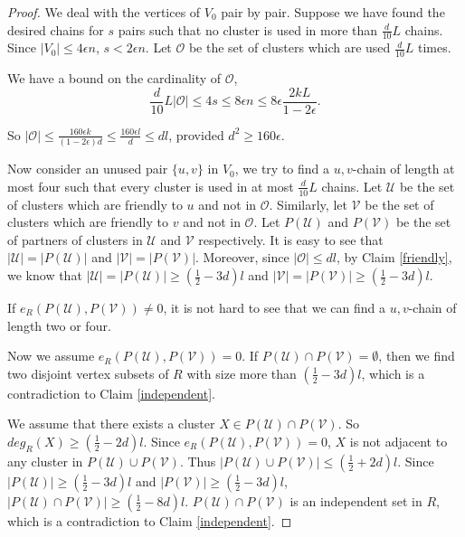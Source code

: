 \documentclass[11pt]{article}
\begin{document}
\begin{proof}
We deal with the vertices of $V_0$ pair by pair. Suppose we have found the desired chains for $s$ pairs such that no cluster is used in more than $\frac{d}{10}L$ chains. Since $|V_0|\leq 4\epsilon n$, $s<2\epsilon n$. Let $\mathcal{O}$ be the set of clusters which are used $\frac{d}{10}L$ times.

We have a bound on the cardinality of $\mathcal{O}$,
$$\frac{d}{10}L|\mathcal{O}|\leq 4s\leq 8\epsilon n\leq 8\epsilon \frac{2kL}{1-2\epsilon }.$$

So $|\mathcal{O}|\leq \frac{160\epsilon k}{(1-2\epsilon )d}\leq \frac{160\epsilon l}{d}\leq dl$, provided $d^2\geq 160\epsilon$.

Now consider an unused pair $\{u,v\}$ in $V_0$, we try to find a $u,v$-chain of length at most four such that every cluster is used in at most $\frac{d}{10}L$ chains. Let $\mathcal {U}$ be the set of clusters which are friendly to $u$ and not in $\mathcal{O}$. Similarly, let $\mathcal {V}$ be the set of clusters which are friendly to $v$ and not in $\mathcal{O}$. Let $P(\mathcal{U})$ and $P(\mathcal{V})$ be the set of partners of clusters in $\mathcal {U}$ and $\mathcal {V}$ respectively. It is easy to see that $|\mathcal {U}|=|P(\mathcal{U})|$ and $|\mathcal {V}|=|P(\mathcal{V})|$. Moreover, since $|\mathcal{O}|\leq dl$, by Claim \ref{friendly}, we know that $|\mathcal {U}|=|P(\mathcal{U})|\geq (\frac{1}{2}-3d)l$ and $|\mathcal {V}|=|P(\mathcal{V})|\geq (\frac{1}{2}-3d)l$.

If $e_R(P(\mathcal{U}),P(\mathcal{V}))\not =0$, it is not hard to see that we can find a $u,v$-chain of length two or four.

Now we assume $e_R(P(\mathcal{U}),P(\mathcal{V}))=0$. If $P(\mathcal{U})\cap P(\mathcal{V})=\emptyset $, then we find two disjoint vertex subsets of $R$ with size more than $(\frac{1}{2}-3d)l$, which is a contradiction to Claim \ref{independent}.

We assume that there exists a cluster $X\in P(\mathcal{U})\cap P(\mathcal{V})$. So $deg_R(X)\geq (\frac{1}{2}-2d)l$. Since $e_R(P(\mathcal{U}),P(\mathcal{V}))=0$, $X$ is not adjacent to any cluster in $P(\mathcal{U})\cup P(\mathcal{V})$. Thus $|P(\mathcal{U})\cup P(\mathcal{V})|\leq (\frac{1}{2}+2d)l$. Since $|P(\mathcal{U})|\geq (\frac{1}{2}-3d)l$ and $|P(\mathcal{V})|\geq (\frac{1}{2}-3d)l$, $|P(\mathcal{U})\cap P(\mathcal{V})|\geq (\frac{1}{2}-8d)l$. $P(\mathcal{U})\cap P(\mathcal{V})$ is an independent set in $R$, which is a contradiction to Claim \ref{independent}.
\end{proof}
\end{document}
